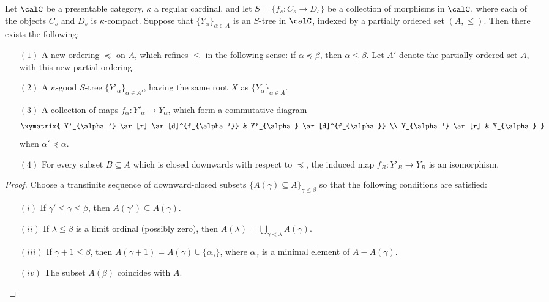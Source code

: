 \begin{CategoryTheory}
\begin{Didn't Read}
\begin{lemma}\label{humber2}
Let $\calC$ be a presentable category, $\kappa$ a regular cardinal, and let $S = \{ f_{s}: C_{s} \rightarrow D_{s} \}$ be a collection of morphisms in $\calC$, where each of the objects $C_{s}$ and $D_{s}$ is $\kappa$-compact. Suppose that $\{ Y_{\alpha} \}_{\alpha \in A}$ is an $S$-tree in $\calC$, indexed by a partially ordered set $(A, \leq)$. Then there exists the following:
\begin{itemize}
\item[$(1)$] A new ordering $\preceq$ on $A$, which refines $\leq$ in the following sense:
if $\alpha \preceq \beta$, then $\alpha \leq \beta$. Let $A'$ denote the partially ordered set $A$, with this new partial ordering.
\item[$(2)$] A $\kappa$-good $S$-tree $\{ Y'_{\alpha} \}_{\alpha \in A'}$, having the same root
$X$ as $\{ Y_{\alpha} \}_{\alpha \in A}$.
\item[$(3)$] A collection of maps $f_{\alpha}: Y'_{\alpha} \rightarrow Y_{\alpha}$, which form a commutative diagram
$$ \xymatrix{ Y'_{\alpha'} \ar[r] \ar[d]^{f_{\alpha'}} & Y'_{\alpha} \ar[d]^{f_{\alpha}} \\
Y_{\alpha'} \ar[r] & Y_{\alpha} }$$
when $\alpha' \preceq \alpha$.
\item[$(4)$] For every subset $B \subseteq A$ which is closed downwards with respect to $\preceq$, the induced map $f_{B}: Y'_{B} \rightarrow Y_{B}$ is an isomorphism.
\end{itemize}
\end{lemma}

\begin{proof}
Choose a transfinite sequence of downward-closed subsets $\{ A(\gamma) \subseteq A \}_{\gamma \leq \beta}$ so that the following conditions are satisfied:
\begin{itemize}
\item[$(i)$] If $\gamma' \leq \gamma \leq \beta$, then $A(\gamma') \subseteq A(\gamma)$.
\item[$(ii)$] If $\lambda \leq \beta$ is a limit ordinal (possibly zero), then
$A(\lambda) = \bigcup_{ \gamma < \lambda} A(\gamma)$.
\item[$(iii)$] If $\gamma + 1 \leq \beta$, then $A(\gamma+1) = A(\gamma) \cup \{ \alpha_{\gamma} \}$, where $\alpha_{\gamma}$ is a minimal element of $A - A(\gamma)$.
\item[$(iv)$] The subset $A(\beta)$ coincides with $A$.
\end{itemize}


\end{proof}
\end{Didn't Read}
\end{CategoryTheory}
